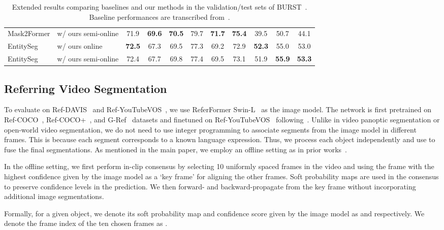 \begin{table*}
\begin{tabular}{llccccccccc}
Mask2Former & w/ ours semi-online & 71.9 & \textbf{69.6} & \textbf{70.5} & 79.7 & \textbf{71.7} & \textbf{75.4} & 39.5 & 50.7 & 44.1 \\
EntitySeg & w/ ours online & \textbf{72.5} & 67.3 & 69.5 & 77.3 & 69.2 & 72.9 & \textbf{52.3} & 55.0 & 53.0 \\
EntitySeg & w/ ours semi-online & 72.4 & 67.7 & 69.8 & 77.4 & 69.5 & 73.1 & 51.9 & \textbf{55.9} & \textbf{53.3} \\
\midrule
\bottomrule
\end{tabular}
     \caption{Extended results comparing baselines and our methods in the validation/test sets of BURST~\cite{athar2023burst}. Baseline performances are transcribed from~\cite{athar2023burst}.}
    \label{tab:app:burst-deta-assa}
\end{table*}

\subsection{Referring Video Segmentation}\label{sec:app:referring-details}
To evaluate on Ref-DAVIS~\cite{khoreva2019video} and Ref-YouTubeVOS~\cite{seo2020urvos}, we use ReferFormer Swin-L~\cite{wu2022language} as the image model. The network is first pretrained on Ref-COCO~\cite{yu2016modeling}, Ref-COCO+~\cite{yu2016modeling}, and G-Ref~\cite{mao2016generation} datasets and finetuned on Ref-YouTubeVOS~\cite{seo2020urvos} following~\cite{wu2022language}.
Unlike in video panoptic segmentation or open-world video segmentation, we do not need to use integer programming to associate segments from the image model in different frames.
This is because each segment corresponds to a known language expression. 
Thus, we process each object independently and use  to fuse the final segmentations.
As mentioned in the main paper, we employ an offline setting as in prior works~\cite{seo2020urvos,wu2022language,ding2022vlt}.

In the offline setting, we first perform in-clip consensus by selecting 10 uniformly spaced frames in
the video and using the frame with the highest confidence given by the image model as a ‘key frame’ for aligning the other frames. 
Soft probability maps are used in the consensus to preserve confidence levels in the prediction.
We then forward- and backward-propagate from the key frame without incorporating additional image segmentations.

Formally, for a given object, we denote its soft probability map and confidence score given by the image model as  and  respectively.
We denote the frame index of the ten chosen frames as .

